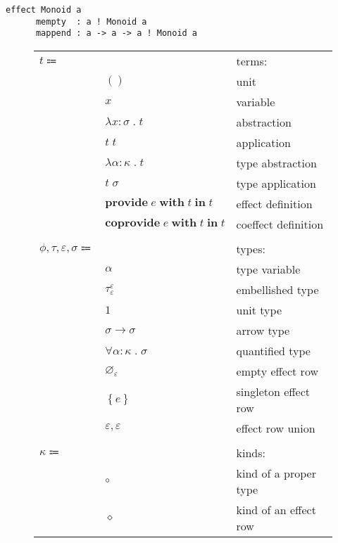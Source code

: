 \documentclass[12pt]{article}
\newcommand\anno[2]{#1 : #2}
\newcommand\term{t}
\newcommand\eunit{()}
\newcommand\evar{x}
\newcommand\eabs[2]{\lambda #1 \; . \; #2}
\newcommand\eapp[2]{#1 \; #2}
\newcommand\etabs[2]{\lambda #1 \; . \; #2}
\newcommand\etapp[2]{#1 \; #2}
\newcommand\eprovide[3]{\textbf{provide} \; #1 \; \textbf{with} \; #2 \; \textbf{in} \; #3}
\newcommand\ecoprovide[3]{\textbf{coprovide} \; #1 \; \textbf{with} \; #2 \; \textbf{in} \; #3}
\newcommand\type{\phi}
\newcommand\proper{\tau}
\newcommand\row{\varepsilon}
\newcommand\embellished{\sigma}
\newcommand\tvar{\alpha}
\newcommand\tembellished[3]{{#1}^{#2}_{#3}}
\newcommand\tunit{1}
\newcommand\tarrow[2]{#1 \rightarrow #2}
\newcommand\tforall[2]{\forall #1 \; . \; #2}
\newcommand\tempty{\varnothing_{\row}}
\newcommand\tsingleton[1]{\left\{ #1 \right\}}
\newcommand\tunion[2]{#1, #2}
\newcommand\kind{\kappa}
\newcommand\kproper{\circ}
\newcommand\krow{\diamond}
\newcommand\effect{e}
\begin{document}
  \begin{lstlisting}[gobble=4]
    effect Monoid a
      mempty  : a ! Monoid a
      mappend : a -> a -> a ! Monoid a
  \end{lstlisting}

  \begin{figure}
    \begin{mdframed}[backgroundcolor=none]
      \begin{center}
        \begin{tabular}{l l l}
          $\term \Coloneqq $ & & terms: \\
          & $\eunit$ & unit \\
          & $\evar$ & variable \\
          & $\eabs{\anno{\evar}{\embellished}}{\term}$ & abstraction \\
          & $\eapp{\term}{\term}$ & application \\
          & $\etabs{\anno{\tvar}{\kind}}{\term}$ & type abstraction \\
          & $\etapp{\term}{\embellished}$ & type application \\
          & $\eprovide{\effect}{\term}{\term}$ & effect definition \\
          & $\ecoprovide{\effect}{\term}{\term}$ & coeffect definition \\
          \\
          $\type, \proper, \row, \embellished \Coloneqq$ & & types: \\
          & $\tvar$ & type variable \\
          & $\tembellished{\proper}{\row}{\row}$ & embellished type \\
          & $\tunit$ & unit type \\
          & $\tarrow{\embellished}{\embellished}$ & arrow type \\
          & $\tforall{\anno{\tvar}{\kind}}{\embellished}$ & quantified type \\
          & $\tempty$ & empty effect row \\
          & $\tsingleton{\effect}$ & singleton effect row \\
          & $\tunion{\row}{\row}$ & effect row union \\
          \\
          $\kind \Coloneqq$ & & kinds: \\
          & $\kproper$ & kind of a proper type \\
          & $\krow$ & kind of an effect row \\

\end{tabular}
\end{center}
\end{mdframed}
\end{figure}
\end{document}
